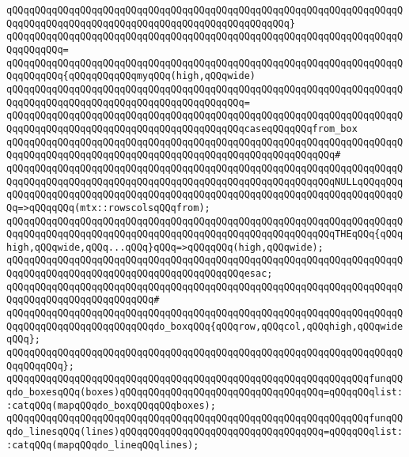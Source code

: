 \verb|qQQqqQQqqQQqqQQqqQQqqQQqqQQqqQQqqQQqqQQqqQQqqQQqqQQqqQQqqQQqqQQqqQQqqQQqqQQqqQQqqQQqqQQqqQQqqQQqqQQqqQQqqQQqqQQqqQQqqQQq}|\newline
\verb|qQQqqQQqqQQqqQQqqQQqqQQqqQQqqQQqqQQqqQQqqQQqqQQqqQQqqQQqqQQqqQQqqQQqqQQqqQQqqQQq=|\newline
\verb|qQQqqQQqqQQqqQQqqQQqqQQqqQQqqQQqqQQqqQQqqQQqqQQqqQQqqQQqqQQqqQQqqQQqqQQqqQQqqQQq{qQQqqQQqqQQqmyqQQq(high,qQQqwide)|\newline
\verb|qQQqqQQqqQQqqQQqqQQqqQQqqQQqqQQqqQQqqQQqqQQqqQQqqQQqqQQqqQQqqQQqqQQqqQQqqQQqqQQqqQQqqQQqqQQqqQQqqQQqqQQqqQQqqQQq=|\newline
\verb|qQQqqQQqqQQqqQQqqQQqqQQqqQQqqQQqqQQqqQQqqQQqqQQqqQQqqQQqqQQqqQQqqQQqqQQqqQQqqQQqqQQqqQQqqQQqqQQqqQQqqQQqqQQqqQQqcaseqQQqqQQqfrom_box|\newline
\verb|qQQqqQQqqQQqqQQqqQQqqQQqqQQqqQQqqQQqqQQqqQQqqQQqqQQqqQQqqQQqqQQqqQQqqQQqqQQqqQQqqQQqqQQqqQQqqQQqqQQqqQQqqQQqqQQqqQQqqQQqqQQqqQQq#|\newline
\verb|qQQqqQQqqQQqqQQqqQQqqQQqqQQqqQQqqQQqqQQqqQQqqQQqqQQqqQQqqQQqqQQqqQQqqQQqqQQqqQQqqQQqqQQqqQQqqQQqqQQqqQQqqQQqqQQqqQQqqQQqqQQqqQQqNULLqQQqqQQqqQQqqQQqqQQqqQQqqQQqqQQqqQQqqQQqqQQqqQQqqQQqqQQqqQQqqQQqqQQqqQQqqQQqqQQq=>qQQqqQQq(mtx::rowscolsqQQqfrom);|\newline
\verb|qQQqqQQqqQQqqQQqqQQqqQQqqQQqqQQqqQQqqQQqqQQqqQQqqQQqqQQqqQQqqQQqqQQqqQQqqQQqqQQqqQQqqQQqqQQqqQQqqQQqqQQqqQQqqQQqqQQqqQQqqQQqqQQqTHEqQQq{qQQqhigh,qQQqwide,qQQq...qQQq}qQQq=>qQQqqQQq(high,qQQqwide);|\newline
\verb|qQQqqQQqqQQqqQQqqQQqqQQqqQQqqQQqqQQqqQQqqQQqqQQqqQQqqQQqqQQqqQQqqQQqqQQqqQQqqQQqqQQqqQQqqQQqqQQqqQQqqQQqqQQqqQQqesac;|\newline
\verb|qQQqqQQqqQQqqQQqqQQqqQQqqQQqqQQqqQQqqQQqqQQqqQQqqQQqqQQqqQQqqQQqqQQqqQQqqQQqqQQqqQQqqQQqqQQqqQQq#|\newline
\verb|qQQqqQQqqQQqqQQqqQQqqQQqqQQqqQQqqQQqqQQqqQQqqQQqqQQqqQQqqQQqqQQqqQQqqQQqqQQqqQQqqQQqqQQqqQQqqQQqdo_boxqQQq{qQQqrow,qQQqcol,qQQqhigh,qQQqwideqQQq};|\newline
\verb|qQQqqQQqqQQqqQQqqQQqqQQqqQQqqQQqqQQqqQQqqQQqqQQqqQQqqQQqqQQqqQQqqQQqqQQqqQQqqQQq};|\newline
\newline
\verb|qQQqqQQqqQQqqQQqqQQqqQQqqQQqqQQqqQQqqQQqqQQqqQQqqQQqqQQqqQQqqQQqfunqQQqdo_boxesqQQq(boxes)qQQqqQQqqQQqqQQqqQQqqQQqqQQqqQQqqQQq=qQQqqQQqlist::catqQQq(mapqQQqdo_boxqQQqqQQqboxes);|\newline
\verb|qQQqqQQqqQQqqQQqqQQqqQQqqQQqqQQqqQQqqQQqqQQqqQQqqQQqqQQqqQQqqQQqfunqQQqdo_linesqQQq(lines)qQQqqQQqqQQqqQQqqQQqqQQqqQQqqQQqqQQq=qQQqqQQqlist::catqQQq(mapqQQqdo_lineqQQqlines);|\newline
